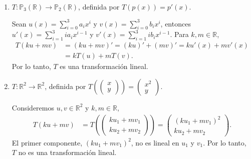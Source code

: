 \begin{example}
\begin{enumerate}
    \item $T: \mathbb{P}_3(\mathbb{R}) \to \mathbb{P}_2(\mathbb{R})$, definida por $T(p(x)) = p'(x)$.

    \begin{myproof}
    Sean $u(x) = \sum_{i=0}^3 a_i x^i$ y $v(x) = \sum_{i=0}^3 b_i x^i$, entonces $u'(x) = \sum_{i=1}^3 i a_i x^{i-1}$ y $v'(x) = \sum_{i=1}^3 i b_i x^{i-1}$. Para $k, m \in \mathbb{R}$,
    \begin{align*}
        T(ku + mv) &= (ku + mv)' = (ku)' + (mv)' = k u'(x) + m v'(x) \\
        &= kT(u) + mT(v).
    \end{align*}
    Por lo tanto, $T$ es una transformación lineal. \qedhere
    \end{myproof}

    \item $T:\mathbb{R}^2 \to \mathbb{R}^2$, definida por $T\left(\begin{pmatrix}x\\y\end{pmatrix}\right) = \begin{pmatrix}x^2 \\ y\end{pmatrix}$.

    \begin{myproof}
    Consideremos $u, v \in \mathbb{R}^2$ y $k, m \in \mathbb{R}$,
    \begin{align*}
        T(ku + mv) &= T\left(\begin{pmatrix}ku_1 + mv_1 \\ ku_2 + mv_2\end{pmatrix}\right) = \begin{pmatrix}(ku_1 + mv_1)^2 \\ ku_2 + mv_2\end{pmatrix}.
    \end{align*}
    El primer componente, $(ku_1 + mv_1)^2$, no es lineal en $u_1$ y $v_1$. Por lo tanto, $T$ no es una transformación lineal. \qedhere
    \end{myproof}
\end{enumerate}
\end{example}


